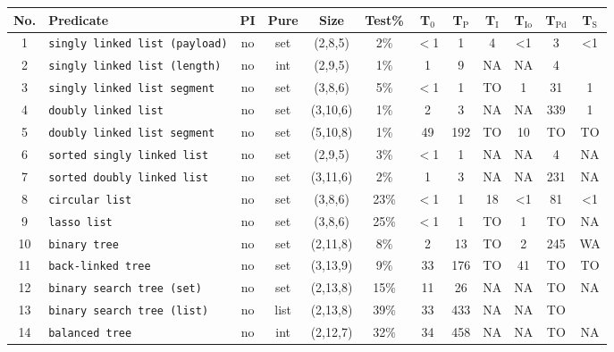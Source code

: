 \begin{table}[t]
\begin{adjustbox}{width=0.98\textwidth}
        \begin{tabular}{cl@{\ }|ccc@{\ }|@{\ }ccc|ccc|c}
          \toprule
          \textbf{No.} &\textbf{Predicate}& \textbf{PI} & \textbf{Pure} & \textbf{Size} & \textbf{Test\%} & \textbf{T$_0$}  & \textbf{T$_\text{P}$} &\textbf{T$_\text{I}$} &\textbf{T$_\text{Io}$} &\textbf{T$_\text{Pd}$} & \textbf{T$_\text{S}$}  \\
          \midrule
          1 &\texttt{singly linked list (payload)}& no & set&       (2,8,5)  & 2\% & $<$1 & 1  & 4 & <1 & 3 & \multirow{2}{*}{{{<1}}}  \\
          2 &\texttt{singly linked list (length)}& no & int&        (2,9,5)  & 1\% & 1 & 9  & NA & NA & 4 &   \\
          3 &\texttt{singly linked list segment}& no & set&         (3,8,6)  & 5\% & $<$1 & 1  & TO & 1 & 31 & 1  \\
          4 &\texttt{doubly linked list}& no & set&                 (3,10,6) & 1\% & 2 & 3  & NA & NA & 339 & 1 \\
          5 &\texttt{doubly linked list segment}& no & set&         (5,10,8) & 1\% & 49 & 192 & TO & 10 &  TO & TO \\
          6 &\texttt{sorted singly linked list}& no & set&          (2,9,5)  & 3\% & $<$1 & 1  & NA & NA & 4 & NA \\
          7 &\texttt{sorted doubly linked list}& no & set&          (3,11,6) & 2\% & 1 & 3  & NA & NA & 231 & NA \\
          8 &\texttt{circular list}& no & set&                      (3,8,6)  & 23\% & $<$1 & 1  & 18 & <1 & 81 & <1  \\
          9 &\texttt{lasso list}& no & set&                         (3,8,6)  & 25\% & $<$1 & 1  & TO & 1 & TO & NA \\
          10 &\texttt{binary tree}&  no & set&                       (2,11,8) & 8\% & 2 &13 & TO & 2 & 245 & WA \\
          11 &\texttt{back-linked tree}&  no & set&                  (3,13,9) & 9\% & 33 & 176 & TO & 41 & TO & TO   \\
          12 &\texttt{binary search tree (set)}& no & set&                 (2,13,8) & 15\% & 11 &26 & NA & NA & TO & \multirow{2}{*}{{{NA}}} \\
          13 &\texttt{binary search tree (list)}& no & list&                (2,13,8) & 39\% & 33 &433  & NA & NA & TO  \\
          14 &\texttt{balanced tree}& no & int&                        (2,12,7) & 32\% & 34 & 458  & NA & NA & TO & NA \\

\end{tabular}
\end{adjustbox}
\end{table}
